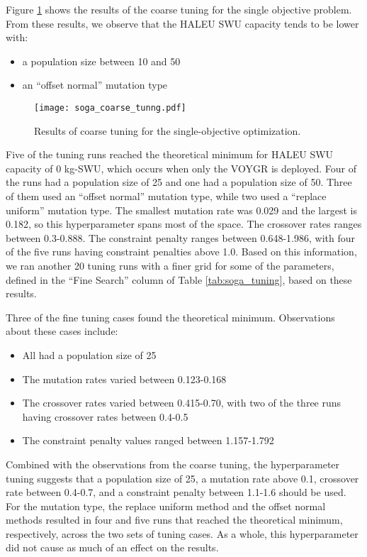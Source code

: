 Figure \ref{fig:soga_coarse_tuning} shows the results of the coarse tuning 
for the single objective problem. From these results, we observe that the 
\gls{HALEU} \gls{SWU} capacity tends to be lower with:
\begin{itemize}
    \item a population size between 10 and 50
    \item an ``offset normal'' mutation type
\end{itemize}

\begin{figure}
    \texttt{[image: soga\_coarse\_tunng.pdf]}
    \caption{Results of coarse tuning for the single-objective 
    optimization.}
    \label{fig:soga_coarse_tuning}
\end{figure}

Five of the tuning runs reached the theoretical minimum for \gls{HALEU} \gls{SWU} 
capacity of 0 kg-SWU, which occurs when only the VOYGR is deployed. Four of the 
runs had a population size of 25 and one had a population size of 50. Three of 
them used an ``offset normal'' mutation 
type, while two used a ``replace uniform'' mutation type. The smallest mutation 
rate was 0.029 and the largest is 0.182, so this hyperparameter spans most of 
the space. The crossover rates ranges between 0.3-0.888. The constraint 
penalty ranges between 0.648-1.986, with four of the five runs having constraint 
penalties above 1.0. Based on this information, we ran another 20 tuning runs with 
a finer grid for some of the parameters, defined in the ``Fine Search'' column of 
Table \ref{tab:soga_tuning}, based on these results. 

Three of the fine tuning cases found the theoretical minimum. Observations about 
these cases include:
\begin{itemize}
    \item All had a population size of 25
    \item The mutation rates varied between 0.123-0.168
    \item The crossover rates varied between 0.415-0.70, with two of the three 
          runs having crossover rates between 0.4-0.5
    \item The constraint penalty values ranged between 1.157-1.792
\end{itemize}
Combined with the observations from the coarse tuning, the hyperparameter 
tuning suggests that a population size of 25, a mutation rate above 
0.1, crossover rate between 0.4-0.7, and a constraint penalty 
between 1.1-1.6 should be used. For the mutation type, the replace uniform 
method and the offset normal methods resulted in four and five runs that 
reached the theoretical minimum, respectively, across the two sets of 
tuning cases. As a whole, this hyperparameter did not cause as much of 
an effect on the results.

